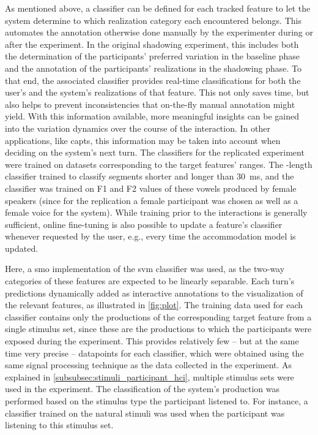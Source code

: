 As mentioned above, a classifier can be defined for each tracked feature to let the system determine to which realization category each encountered belongs.
This automates the annotation otherwise done manually by the experimenter during or after the experiment.
In the original shadowing experiment, this includes both the determination of the participants' preferred variation in the baseline phase and the annotation of the participants' realizations in the shadowing phase.
To that end, the associated classifier provides real-time classifications for both the user's and the system's realizations of that feature.
This not only saves time, but also helps to prevent inconsistencies that on-the-fly manual annotation might yield.
With this information available, more meaningful insights can be gained into the variation dynamics over the course of the interaction.
In other applications, like \acp{capt}, this information may be taken into account when deciding on the system's next turn.
The classifiers for the replicated experiment were trained on datasets corresponding to the target features' ranges.
The -length classifier trained to classify segments shorter and longer than \SI{30}{\milli\second}, and the  classifier was trained on F1 and F2 values of these vowels produced by female speakers (since for the replication a female participant was chosen as well as a female voice for the system).
While training prior to the interactions is generally sufficient, online fine-tuning is also possible to update a feature's classifier whenever requested by the user, e.g., every time the accommodation model is updated.

Here, a \ac{smo} \citep{Platt1999fast, Platt1998sequential} implementation of the \ac{svm} classifier \citep{Vapnik1998support, Joachims2005support} was used, as the two-way categories of these features are expected to be linearly separable.
Each turn's predictions dynamically added as interactive annotations to the visualization of the relevant features, as illustrated in \cref{fig:plot}.
The training data used for each classifier contains only the productions of the corresponding target feature from a single stimulus set, since these are the productions to which the participants were exposed during the experiment.
This provides relatively few -- but at the same time very precise -- datapoints for each classifier,
which were obtained using the same signal processing technique as the data collected in the experiment.
As explained in \cref{subsubsec:stimuli_participant_hci}, multiple stimulus sets were used in the experiment.
The classification of the system's production was performed based on the stimulus type the participant listened to.
For instance, a classifier trained on the natural stimuli was used when the participant was listening to this stimulus set.

